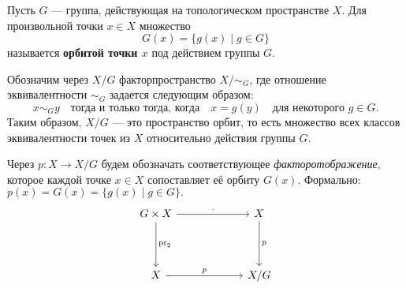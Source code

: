 	\begin{definition}
	Пусть $ G $ — группа, действующая на топологическом пространстве $ X $. Для произвольной точки $ x \in X $ множество
	\[
	G(x) = \{g(x) \mid g \in G\}
	\]
	называется \textbf{орбитой точки $ x $} под действием группы $ G $.
	\end{definition}

	Обозначим через $ X/G $ факторпространство $ X / \sim_G $, где отношение эквивалентности $ \sim_G $ задается следующим образом:
	\[
	x \sim_G y \quad \text{тогда и только тогда, когда} \quad x = g(y) \quad \text{для некоторого } g \in G.
	\]
	Таким образом, $ X/G $ — это пространство орбит, то есть множество всех классов эквивалентности точек из $ X $ относительно действия группы $ G $.
	
	Через $ p: X \to X/G $ будем обозначать соответствующее \textit{факторотображение}, которое каждой точке $ x \in X $ сопоставляет её орбиту $ G(x) $. Формально:
	\(
	p(x) = G(x) = \{g(x) \mid g \in G\}.
	\)
	\[
\begin{tikzcd}[row sep=40pt, column sep=60pt]
    G \times X \arrow{r}{\cdot} \arrow{d}{\mathrm{pr}_2} & X \arrow{d}{p} \\
    X \arrow{r}{p} & X/G
\end{tikzcd}
\]
	
